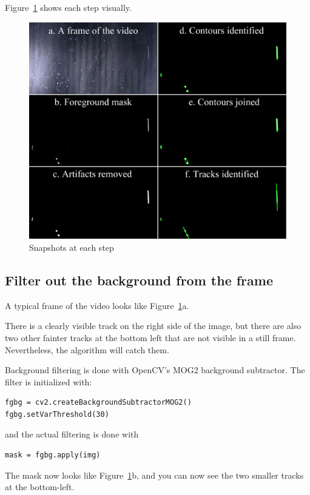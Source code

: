 \documentclass[notitlepage,12pt]{article}
\begin{document}
Figure~\ref{fig:frames} shows each step visually.

\begin{figure}[ht!]
	\centering
	\includegraphics[width=.9\textwidth]{frames}
	\caption{Snapshots at each step\label{fig:frames}}
\end{figure}

\subsection{Filter out the background from the frame}

A typical frame of the video looks like Figure~\ref{fig:frames}a.

There is a clearly visible track on the right side of the image, but there are also two other fainter tracks at the bottom left that are not visible in a still frame.  Nevertheless, the algorithm will catch them.

Background filtering is done with OpenCV's MOG2 background subtractor.  The filter is initialized with:
\begin{lstlisting}
fgbg = cv2.createBackgroundSubtractorMOG2()
fgbg.setVarThreshold(30)
\end{lstlisting}
and the actual filtering is done with 
\begin{lstlisting}
mask = fgbg.apply(img)
\end{lstlisting}

The mask now looks like Figure~\ref{fig:frames}b, and you can now see the two smaller tracks at the bottom-left.
\end{document}
